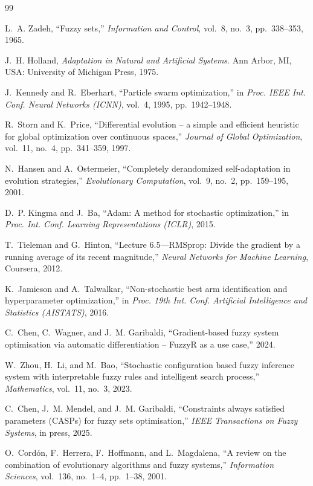 \documentclass[a4paper,12pt,oneside]{article}
\begin{document}
\begin{thebibliography}{99}

L.~A. Zadeh, ``Fuzzy sets,'' \emph{Information and Control}, vol.~8, no.~3,
pp.~338--353, 1965.

J.~H. Holland, \emph{Adaptation in Natural and Artificial Systems}.
Ann Arbor, MI, USA: University of Michigan Press, 1975.

J.~Kennedy and R.~Eberhart, ``Particle swarm optimization,'' in
\emph{Proc. IEEE Int. Conf. Neural Networks (ICNN)}, vol.~4, 1995,
pp.~1942--1948.

R.~Storn and K.~Price, ``Differential evolution -- a simple and efficient
heuristic for global optimization over continuous spaces,''
\emph{Journal of Global Optimization}, vol.~11, no.~4, pp.~341--359, 1997.

N.~Hansen and A.~Ostermeier, ``Completely derandomized self-adaptation in
evolution strategies,'' \emph{Evolutionary Computation}, vol.~9, no.~2,
pp.~159--195, 2001.

D.~P. Kingma and J.~Ba, ``Adam: A method for stochastic optimization,'' in
\emph{Proc. Int. Conf. Learning Representations (ICLR)}, 2015.

T.~Tieleman and G.~Hinton, ``Lecture 6.5---RMSprop: Divide the gradient by a
running average of its recent magnitude,'' \emph{Neural Networks for Machine
Learning}, Coursera, 2012.

K.~Jamieson and A.~Talwalkar, ``Non-stochastic best arm identification and
hyperparameter optimization,'' in
\emph{Proc. 19th Int. Conf. Artificial Intelligence and Statistics (AISTATS)},
2016.

C.~Chen, C.~Wagner, and J.~M. Garibaldi,
``Gradient-based fuzzy system optimisation via automatic differentiation --
FuzzyR as a use case,'' 2024.

W.~Zhou, H.~Li, and M.~Bao,
``Stochastic configuration based fuzzy inference system with interpretable fuzzy
rules and intelligent search process,''
\emph{Mathematics}, vol.~11, no.~3, 2023.

C.~Chen, J.~M. Mendel, and J.~M. Garibaldi,
``Constraints always satisfied parameters (CASPs) for fuzzy sets optimisation,''
\emph{IEEE Transactions on Fuzzy Systems}, in press, 2025.

O.~Cordón, F.~Herrera, F.~Hoffmann, and L.~Magdalena,
``A review on the combination of evolutionary algorithms and fuzzy systems,''
\emph{Information Sciences}, vol.~136, no.~1--4, pp.~1--38, 2001.


\end{thebibliography}
\end{document}
